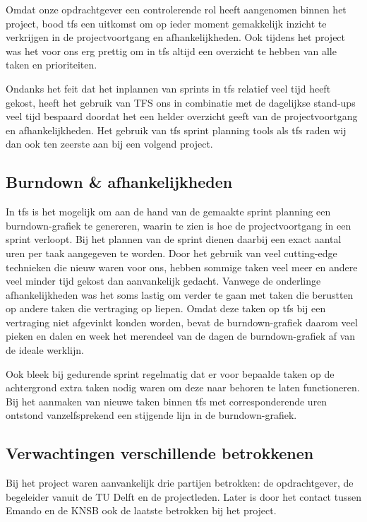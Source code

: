 Omdat onze opdrachtgever een controlerende rol heeft aangenomen binnen het project, bood \ac{tfs} een uitkomst om op ieder moment gemakkelijk inzicht te verkrijgen in de projectvoortgang en afhankelijkheden. Ook tijdens het project was het voor ons erg prettig om in \ac{tfs} altijd een overzicht te hebben van alle taken en prioriteiten. 

Ondanks het feit dat het inplannen van sprints in \ac{tfs} relatief veel tijd heeft gekost, heeft het gebruik van TFS ons in combinatie met de dagelijkse stand-ups veel tijd bespaard doordat het een helder overzicht geeft van de projectvoortgang en afhankelijkheden. Het gebruik van \ac{tfs} sprint planning tools als \ac{tfs} raden wij dan ook ten zeerste aan bij een volgend project.

\subsection{Burndown \& afhankelijkheden}
In \ac{tfs} is het mogelijk om aan de hand van de gemaakte sprint planning een burndown-grafiek te genereren, waarin te zien is hoe de projectvoortgang in een sprint verloopt. Bij het plannen van de sprint dienen daarbij een exact aantal uren per taak aangegeven te worden. Door het gebruik van veel cutting-edge technieken die nieuw waren voor ons, hebben sommige taken veel meer en andere veel minder tijd gekost dan aanvankelijk gedacht. Vanwege de onderlinge afhankelijkheden was het soms lastig om verder te gaan met taken die berustten op andere taken die vertraging op liepen. Omdat deze taken op \ac{tfs} bij een vertraging niet afgevinkt konden worden, bevat de burndown-grafiek daarom veel pieken en dalen en week het merendeel van de dagen de burndown-grafiek af van de ideale werklijn. 

Ook bleek bij gedurende sprint regelmatig dat er voor bepaalde taken op de achtergrond extra taken nodig waren om deze naar behoren te laten functioneren. Bij het aanmaken van nieuwe taken binnen \ac{tfs} met corresponderende uren ontstond vanzelfsprekend een stijgende lijn in de burndown-grafiek.


\subsection{Verwachtingen verschillende betrokkenen}
Bij het project waren aanvankelijk drie partijen betrokken: de opdrachtgever, de begeleider vanuit de TU Delft en de projectleden.
Later is door het contact tussen Emando en de KNSB ook de laatste betrokken bij het project. 

